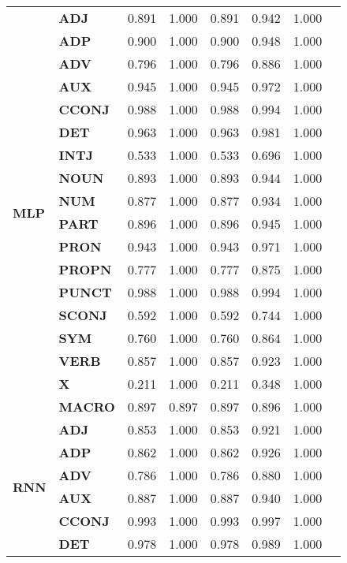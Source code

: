 \begin{longtable}{|l||l||l||l||l||l||l||l|}
\cline{1-7}
\multirow[t]{18}{*}{\textbf{MLP}} & \textbf{ADJ} & 0.891 & 1.000 & 0.891 & 0.942 & 1.000 \\
\textbf{} & \textbf{ADP} & 0.900 & 1.000 & 0.900 & 0.948 & 1.000 \\
\textbf{} & \textbf{ADV} & 0.796 & 1.000 & 0.796 & 0.886 & 1.000 \\
\textbf{} & \textbf{AUX} & 0.945 & 1.000 & 0.945 & 0.972 & 1.000 \\
\textbf{} & \textbf{CCONJ} & 0.988 & 1.000 & 0.988 & 0.994 & 1.000 \\
\textbf{} & \textbf{DET} & 0.963 & 1.000 & 0.963 & 0.981 & 1.000 \\
\textbf{} & \textbf{INTJ} & 0.533 & 1.000 & 0.533 & 0.696 & 1.000 \\
\textbf{} & \textbf{NOUN} & 0.893 & 1.000 & 0.893 & 0.944 & 1.000 \\
\textbf{} & \textbf{NUM} & 0.877 & 1.000 & 0.877 & 0.934 & 1.000 \\
\textbf{} & \textbf{PART} & 0.896 & 1.000 & 0.896 & 0.945 & 1.000 \\
\textbf{} & \textbf{PRON} & 0.943 & 1.000 & 0.943 & 0.971 & 1.000 \\
\textbf{} & \textbf{PROPN} & 0.777 & 1.000 & 0.777 & 0.875 & 1.000 \\
\textbf{} & \textbf{PUNCT} & 0.988 & 1.000 & 0.988 & 0.994 & 1.000 \\
\textbf{} & \textbf{SCONJ} & 0.592 & 1.000 & 0.592 & 0.744 & 1.000 \\
\textbf{} & \textbf{SYM} & 0.760 & 1.000 & 0.760 & 0.864 & 1.000 \\
\textbf{} & \textbf{VERB} & 0.857 & 1.000 & 0.857 & 0.923 & 1.000 \\
\textbf{} & \textbf{X} & 0.211 & 1.000 & 0.211 & 0.348 & 1.000 \\
\textbf{} & \textbf{MACRO} & 0.897 & 0.897 & 0.897 & 0.896 & 1.000 \\
\cline{1-7}
\multirow[t]{18}{*}{\textbf{RNN}} & \textbf{ADJ} & 0.853 & 1.000 & 0.853 & 0.921 & 1.000 \\
\textbf{} & \textbf{ADP} & 0.862 & 1.000 & 0.862 & 0.926 & 1.000 \\
\textbf{} & \textbf{ADV} & 0.786 & 1.000 & 0.786 & 0.880 & 1.000 \\
\textbf{} & \textbf{AUX} & 0.887 & 1.000 & 0.887 & 0.940 & 1.000 \\
\textbf{} & \textbf{CCONJ} & 0.993 & 1.000 & 0.993 & 0.997 & 1.000 \\
\textbf{} & \textbf{DET} & 0.978 & 1.000 & 0.978 & 0.989 & 1.000 \\

\end{longtable}
